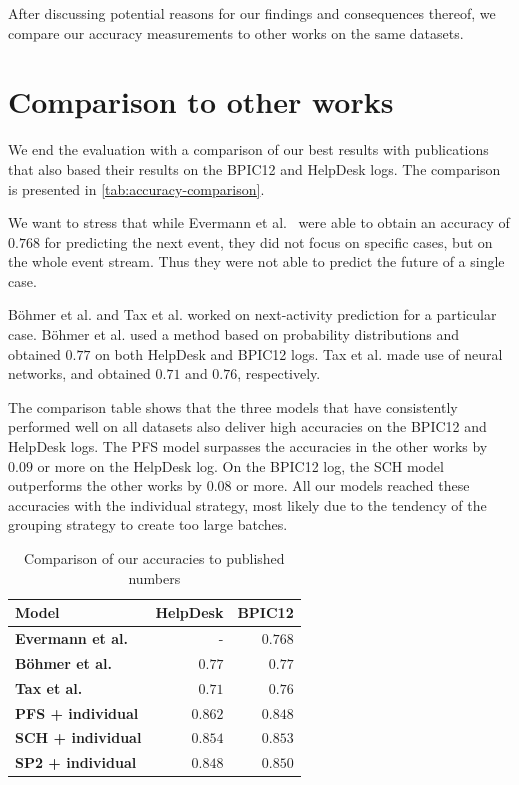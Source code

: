 After discussing potential reasons for our findings and consequences thereof, we compare our accuracy measurements to other works on the same datasets.

\section{Comparison to other works}
We end the evaluation with a comparison of our best results with publications that also based their results on the BPIC12 and HelpDesk logs.
The comparison is presented in \autoref{tab:accuracy-comparison}.

We want to stress that while Evermann et al.~\cite{evermann2016} were able to obtain an accuracy of $0.768$ for predicting the next event, they did not focus on specific cases, but on the whole event stream.
Thus they were not able to predict the future of a single case.

Böhmer et al. and Tax et al. worked on next-activity prediction for a particular case.
Böhmer et al. used a method based on probability distributions and obtained $0.77$ on both HelpDesk and BPIC12 logs.
Tax et al. made use of neural networks, and obtained $0.71$ and $0.76$, respectively.

The comparison table shows that the three models that have consistently performed well on all datasets also deliver high accuracies on the BPIC12 and HelpDesk logs.
The PFS model surpasses the accuracies in the other works by $0.09$ or more on the HelpDesk log.
On the BPIC12 log, the SCH model outperforms the other works by $0.08$ or more.
All our models reached these accuracies with the individual strategy, most likely due to the tendency of the grouping strategy to create too large batches.\\

\begin{table}[!htb]
\centering
\begin{tabular}{lrr}
\textbf{Model}  &  \textbf{HelpDesk} &  \textbf{BPIC12} \\
\midrule
\textbf{Evermann et al.~\cite{evermann2016}} & - & $0.768$\\
\textbf{Böhmer et al.~\cite{boehmer2018probability}  } & $0.77$ & $0.77$ \\
\textbf{Tax et al.~\cite{tax2017}} & $0.71$ & $0.76$\\
\hline
\textbf{PFS + individual} & $0.862$ & $0.848$ \\
\textbf{SCH + individual} & $0.854$ & $0.853$ \\
\textbf{SP2 + individual} & $0.848$ & $0.850$\\
\end{tabular}
\caption{Comparison of our accuracies to published numbers}
\label{tab:accuracy-comparison}
\end{table}

